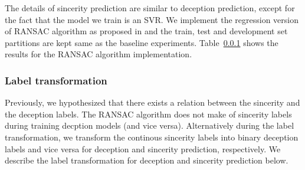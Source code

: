 \documentclass{article}
\begin{document}
The details of sincerity prediction are similar to deception prediction, except for the fact that the model we train is an SVR.
We implement the regression version of RANSAC algorithm as proposed in \cite{} and the train, test and development set partitions are kept same as the baseline experiments.
Table~\ref{} shows the results for the RANSAC algorithm implementation.

\subsubsection{Label transformation}

Previously, we hypothesized that there exists a relation between the sincerity and the deception labels.
The RANSAC algorithm does not make of sincerity labels during training decption models (and vice versa). 
Alternatively during the label transformation, we transform the continous sincerity labels into binary deception labels and vice versa for deception and sincerity prediction, respectively.
We describe the label transformation for deception and sincerity prediction below.
\end{document}

